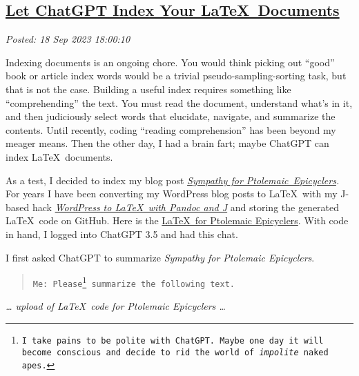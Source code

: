 %

\subsection*{\href{http://analyzethedatanotthedrivel.org/2023/09/18/let-chatgpt-index-your-latex-documents/}{Let ChatGPT Index Your \LaTeX\ Documents}}


\noindent\emph{Posted: 18 Sep 2023 18:00:10}
\vspace{6pt}

Indexing documents is an ongoing chore. You would think picking out
``good'' book or article index words would be a trivial
pseudo-sampling-sorting task, but that is not the case. Building a
useful index requires something like ``comprehending'' the text. You
must read the document, understand what's in it, and then judiciously
select words that elucidate, navigate, and summarize the contents. Until
recently, coding ``reading comprehension'' has been beyond my meager
means. Then the other day, I had a brain fart; maybe ChatGPT can index
\LaTeX\ documents.

As a test, I decided to index my blog post
\emph{\href{https://analyzethedatanotthedrivel.org/2023/04/07/sympathy-for-ptolemaic-epicyclers/}{Sympathy
for Ptolemaic~Epicyclers}.} For years I have been converting my
WordPress blog posts to \LaTeX\ with my J-based hack
\emph{\href{https://analyzethedatanotthedrivel.org/2012/02/11/wordpress-to-latex-with-pandoc-and-j-prerequisites-part-1/}{WordPress
to \LaTeX\ with Pandoc and J}} and storing the generated \LaTeX\ code on
GitHub. Here is the
\href{https://github.com/bakerjd99/Analyze-the-Data-not-the-Drivel/blob/master/wp2latex/sympathyforptolemaic7823.tex}{\LaTeX\
for Ptolemaic Epicyclers}. With code in hand, I logged into ChatGPT 3.5
and had this chat.

I first asked ChatGPT to summarize \emph{Sympathy for Ptolemaic
Epicyclers}.

\begin{quote}
\texttt{Me: Please\footnote{  I take pains to be polite with ChatGPT. Maybe one day it will become
  conscious and decide to rid the world of \emph{impolite} naked
  apes.} summarize %
 the following text.}
\end{quote}

\emph{\ldots{} upload of \LaTeX\ code for Ptolemaic Epicyclers \ldots{}}

